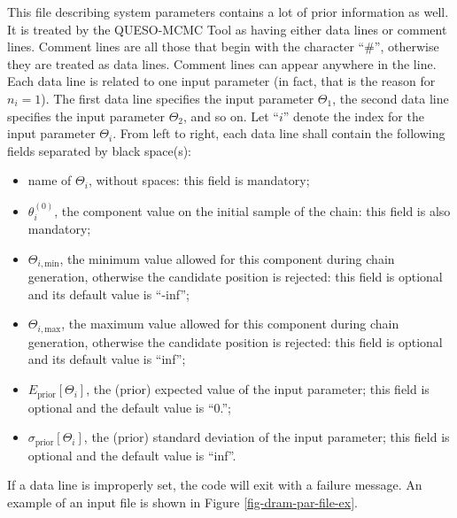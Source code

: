 This file describing system parameters contains a lot of prior information as well.
It is treated by the QUESO-MCMC Tool as having either data lines or comment lines.
Comment lines are all those that begin with the character ``\#'', otherwise they are treated as data lines.
Comment lines can appear anywhere in the line.
Each data line is related to one input parameter (in fact, that is the reason for $n_i=1$). 
The first data line specifies the input parameter $\Theta_1$,
the second data line specifies the input parameter $\Theta_2$,
and so on.
Let ``$i$'' denote the index for the input parameter $\Theta_i$.
From left to right, each data line shall contain the following fields separated by black space(s):
\begin{itemize}
\item name of $\Theta_i$, without spaces: this field is mandatory;
\item $\theta_i^{(0)}$, the component value on the initial sample of the chain: this field is also mandatory;
\item $\Theta_{i,\text{min}}$, the minimum value allowed for this component during chain generation, otherwise the candidate position is rejected: this field is optional and its default value is ``-inf'';
\item $\Theta_{i,\text{max}}$, the maximum value allowed for this component during chain generation, otherwise the candidate position is rejected: this field is optional and its default value is ``inf'';
\item $E_{\text{prior}}[\Theta_i]$, the (prior) expected value of the input parameter; this field is optional and the default value is ``0.'';
\item $\sigma_{\text{prior}}[\Theta_i]$, the (prior) standard deviation of the input parameter; this field is optional and the default value is ``inf''.
\end{itemize}
If a data line is improperly set, the code will exit with a failure message.
An example of an input file is shown in Figure \ref{fig-dram-par-file-ex}.


